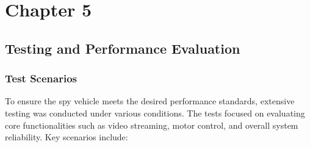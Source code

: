 \documentclass[12pt,a4paper]{report}
\begin{document}
	{\vfill \chapter*{\centering \vfill Chapter 5 \vfill}\vfill}
	\thispagestyle{empty}
	\newpage
	\label{Testing and Performance Evaluation}
	\section{Testing and Performance Evaluation}

\subsection{Test Scenarios}
To ensure the spy vehicle meets the desired performance standards, extensive testing was conducted under various conditions. The tests focused on evaluating core functionalities such as video streaming, motor control, and overall system reliability. Key scenarios include:
\end{document}
